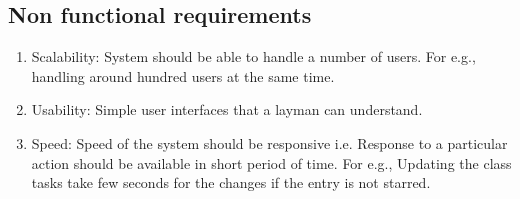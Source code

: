\begin{itemize}
\subsection{Non functional requirements}
\begin{enumerate} 
\item Scalability: System should be able to handle a number of users. 
For e.g., handling around hundred users at the same time.
\item Usability: Simple user interfaces that a layman can understand.
\item Speed: Speed of the system should be responsive i.e. Response to
 a particular action should be available in short period of time. For 
e.g., Updating the class tasks take few seconds for the changes if 
the entry is not starred.
\end{enumerate}
\end{itemize}
